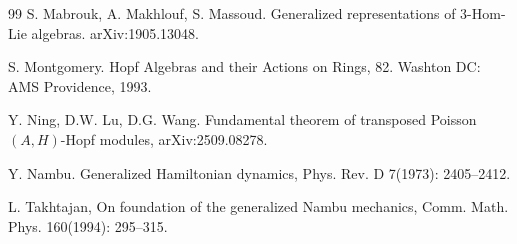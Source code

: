 \documentclass[11pt]{article}
\begin{document}
\begin{thebibliography}{99}
 S. Mabrouk, A. Makhlouf, S. Massoud. Generalized representations of 3-Hom-Lie algebras. arXiv:1905.13048.

 S. Montgomery. Hopf Algebras and their Actions on Rings, 82. Washton DC: AMS Providence, 1993.

 Y. Ning, D.W. Lu, D.G. Wang. Fundamental theorem of transposed Poisson $(A,H)$-Hopf modules, arXiv:2509.08278.

 Y. Nambu. Generalized Hamiltonian dynamics, Phys. Rev. D 7(1973): 2405--2412.

 L. Takhtajan, On foundation of the generalized Nambu mechanics, Comm. Math. Phys. 160(1994): 295--315.
\end{thebibliography}
\end{document}
